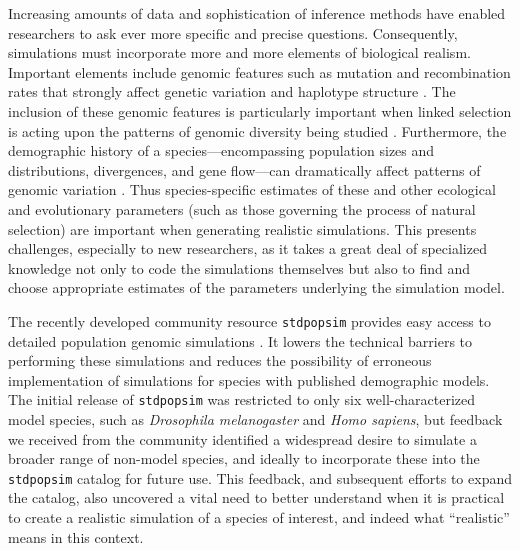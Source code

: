 \documentclass[hidelinks]{article}
\newcommand{\stdpopsim}{\texttt{stdpopsim}\xspace}
\begin{document}
Increasing amounts of data and sophistication of inference methods
have enabled researchers to ask ever more
specific and precise questions. Consequently, simulations must incorporate
more and more elements of biological realism.
Important elements include genomic features such as mutation and recombination
rates that strongly affect genetic variation and haplotype structure
\citep{Nachman2002}. The inclusion of these genomic features is particularly important
when linked selection is acting upon the patterns of genomic diversity being studied \citep{Cutter2013}.
Furthermore, the demographic history of a species---encompassing population sizes and distributions, divergences, and gene flow---can
dramatically affect patterns of genomic variation \citep{Teshima2006}. Thus
species-specific estimates of these and other ecological and evolutionary parameters 
(such as those governing the process of natural selection) 
are important when generating realistic simulations.
This presents challenges, especially to new researchers,
as it takes a great deal of specialized knowledge not only to code the simulations themselves
but also to find and choose appropriate estimates of the parameters underlying the simulation model.

The recently developed community resource \stdpopsim provides easy
access to detailed population genomic simulations \citep{Adrion2020}. It
lowers the technical barriers to performing these simulations
and reduces the possibility of erroneous implementation of simulations
for species with published demographic models. 
The initial release of \stdpopsim was
restricted to only six well-characterized model species, such as
\emph{Drosophila melanogaster} and \emph{Homo sapiens},
but feedback we received from the community identified a widespread desire
to simulate a broader range of non-model species,
and ideally to incorporate these into the \stdpopsim catalog for future use.
This feedback, and subsequent efforts to expand the catalog, 
also uncovered a vital need to better understand when it is practical to create a realistic
simulation of a species of interest, and indeed what ``realistic'' means in this context.
\end{document}
